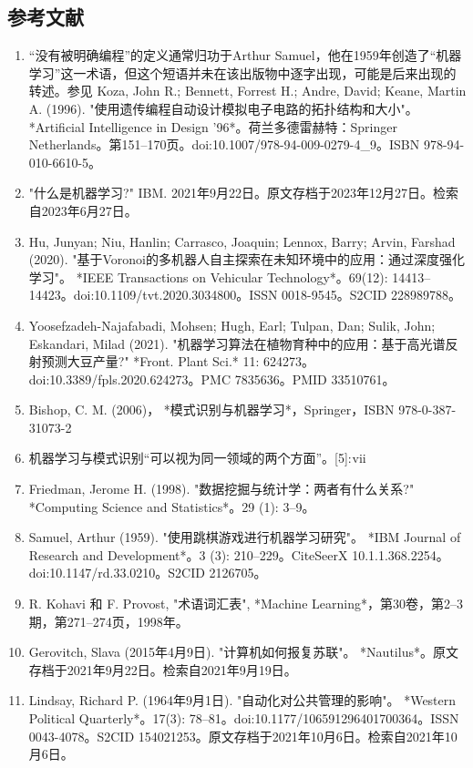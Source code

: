 \subsection{参考文献}  
\begin{enumerate}
\item “没有被明确编程”的定义通常归功于Arthur Samuel，他在1959年创造了“机器学习”这一术语，但这个短语并未在该出版物中逐字出现，可能是后来出现的转述。参见 Koza, John R.; Bennett, Forrest H.; Andre, David; Keane, Martin A. (1996). "使用遗传编程自动设计模拟电子电路的拓扑结构和大小"。 *Artificial Intelligence in Design '96*。荷兰多德雷赫特：Springer Netherlands。第151–170页。doi:10.1007/978-94-009-0279-4_9。ISBN 978-94-010-6610-5。  
\item "什么是机器学习?" IBM. 2021年9月22日。原文存档于2023年12月27日。检索自2023年6月27日。  
\item Hu, Junyan; Niu, Hanlin; Carrasco, Joaquin; Lennox, Barry; Arvin, Farshad (2020). "基于Voronoi的多机器人自主探索在未知环境中的应用：通过深度强化学习"。 *IEEE Transactions on Vehicular Technology*。69(12): 14413–14423。doi:10.1109/tvt.2020.3034800。ISSN 0018-9545。S2CID 228989788。  
\item Yoosefzadeh-Najafabadi, Mohsen; Hugh, Earl; Tulpan, Dan; Sulik, John; Eskandari, Milad (2021). "机器学习算法在植物育种中的应用：基于高光谱反射预测大豆产量?" *Front. Plant Sci.* 11: 624273。doi:10.3389/fpls.2020.624273。PMC 7835636。PMID 33510761。  
\item Bishop, C. M. (2006)， *模式识别与机器学习*，Springer，ISBN 978-0-387-31073-2 
\item 机器学习与模式识别“可以视为同一领域的两个方面”。[5]: vii  
\item Friedman, Jerome H. (1998). "数据挖掘与统计学：两者有什么关系?" *Computing Science and Statistics*。29 (1): 3–9。  
\item Samuel, Arthur (1959). "使用跳棋游戏进行机器学习研究"。 *IBM Journal of Research and Development*。3 (3): 210–229。CiteSeerX 10.1.1.368.2254。doi:10.1147/rd.33.0210。S2CID 2126705。  
\item R. Kohavi 和 F. Provost, "术语词汇表", *Machine Learning*，第30卷，第2–3期，第271–274页，1998年。  
\item Gerovitch, Slava (2015年4月9日). "计算机如何报复苏联"。 *Nautilus*。原文存档于2021年9月22日。检索自2021年9月19日。
\item Lindsay, Richard P. (1964年9月1日). "自动化对公共管理的影响"。 *Western Political Quarterly*。17(3): 78–81。doi:10.1177/106591296401700364。ISSN 0043-4078。S2CID 154021253。原文存档于2021年10月6日。检索自2021年10月6日。  

\end{enumerate}
